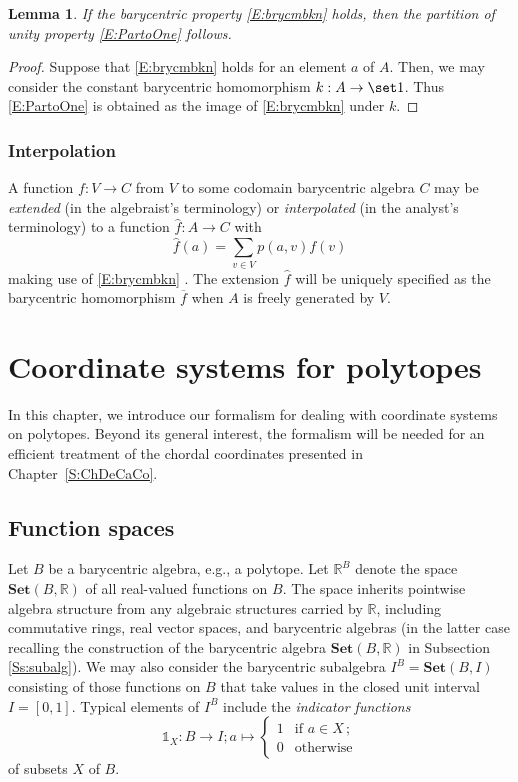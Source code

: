 \documentclass[12pt]{amsart}
\theoremstyle{plain}
\newtheorem{lemma}[theorem]{Lemma}
\theoremstyle{definition}
\numberwithin{equation}{section}
\begin{document}
\begin{lemma}\label{L:BPimpPO1}
If the barycentric property \eqref{E:brycmbkn} holds, then the partition of unity property \eqref{E:PartoOne} follows.
\end{lemma}


\begin{proof}
Suppose that \eqref{E:brycmbkn} holds for an element $a$ of $A$. Then, we may consider the constant barycentric homomorphism $k:A\to\set 1$. Thus \eqref{E:PartoOne} is obtained as the image of \eqref{E:brycmbkn} under $k$.
\end{proof}

\subsubsection{Interpolation}


A function $f\colon V\to C$ from $V$ to some codomain barycentric algebra $C$ may be \emph{extended} (in the algebraist's terminology) or \emph{interpolated} (in the analyst's terminology) to a function $\widehat f\colon A\to C$ with
$$
\widehat f(a)=\sum_{v\in V}p(a,v)f(v)
$$
making use of \eqref{E:brycmbkn} \cite[(2)]{WarSchHirDes}. The extension $\widehat f$ will be uniquely specified as the barycentric homomorphism $\overline f$ when  $A$ is freely generated by $V$.


\section{Coordinate systems for polytopes}\label{S:CoSyPoly}


In this chapter, we introduce our formalism for dealing with coordinate systems on polytopes. Beyond its general interest, the formalism will be needed for an efficient treatment of the chordal coordinates presented in Chapter~\ref{S:ChDeCaCo}.



\subsection{Function spaces}


Let $B$ be a barycentric algebra, e.g., a polytope. Let $\mathbb R^B$ denote the space $\mathbf{Set}(B,\mathbb R)$ of all real-valued functions on $B$. The space inherits pointwise algebra structure from any algebraic structures carried by $\mathbb R$, including commutative rings, real vector spaces, and barycentric algebras (in the latter case recalling the construction of the barycentric algebra $\mathbf{Set}(B,\mathbb R)$ in Subsection \ref{Ss:subalg}). We may also consider the barycentric subalgebra $I^B=\mathbf{Set}(B,I)$ consisting of those functions on $B$ that take values in the closed unit interval $I=[0,1]$. Typical elements of $I^B$ include the \emph{indicator functions}
\begin{equation}\label{E:IndctrFn}
\mathds 1_X\colon B\to I;
a\mapsto
\begin{cases}
1 &\mbox{if } a\in X\,;\\
0 &\mbox{otherwise}
\end{cases}
\end{equation}
of subsets $X$ of $B$.
\end{document}
